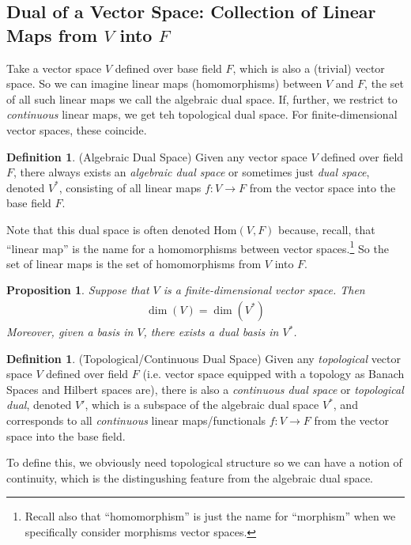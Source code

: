 \documentclass[12pt]{book}
\numberwithin{equation}{section} %
\theoremstyle{plain}
\newtheorem{prop}[thm]{Proposition}
\theoremstyle{definition}
\newtheorem{defn}[thm]{Definition}
\theoremstyle{remark}
\newcommand{\ra}{\rightarrow}
\begin{document}
\clearpage
\subsection{Dual of a Vector Space: Collection of Linear Maps from $V$ into $F$}
\label{sec:dualsvectorspace}

Take a vector space $V$ defined over base field $F$, which is also a
(trivial) vector space.
So we can imagine linear maps (homomorphisms) between $V$ and $F$, the
set of all such linear maps we call the algebraic dual space.
If, further, we restrict to \emph{continuous} linear maps, we get teh
topological dual space.
For finite-dimensional vector spaces, these coincide.

\begin{defn}(Algebraic Dual Space)
Given any vector space $V$ defined over field $F$, there always
exists an \emph{algebraic dual space} or sometimes just
\emph{dual space}, denoted $V^*$, consisting of all linear maps $f : V
\ra F$ from the vector space into the base field $F$.

Note that this dual space is often denoted
$\text{Hom}(V,F)$ because, recall, that ``linear map'' is the name for a
homomorphisms between vector spaces.\footnote{%
  Recall also that ``homomorphism'' is just the name for ``morphism''
  when we specifically consider morphisms vector spaces.
}
So the set of linear maps is the set of homomorphisms from $V$ into
$F$.
\end{defn}

\begin{prop}
Suppose that $V$ is a finite-dimensional vector space.
Then
\begin{align*}
  \operatorname{dim}(V)=\operatorname{dim}(V^*)
\end{align*}
Moreover, given a basis in $V$, there exists a dual basis in $V^*$.
\end{prop}



\begin{defn}(Topological/Continuous Dual Space)
Given any \emph{topological} vector space $V$ defined over field $F$
(i.e. vector space equipped with a topology as Banach Spaces and Hilbert
spaces are),
there is also a \emph{continuous dual space} or \emph{topological dual},
denoted $V'$, which is a subspace of the algebraic dual space $V^*$,
and corresponds to all \emph{continuous} linear maps/functionals $f:
V\ra F$ from the vector space into the base field.

To define this, we obviously need topological structure so we can have a
notion of continuity, which is the distingushing feature from the
algebraic dual space.
\end{defn}
\end{document}
